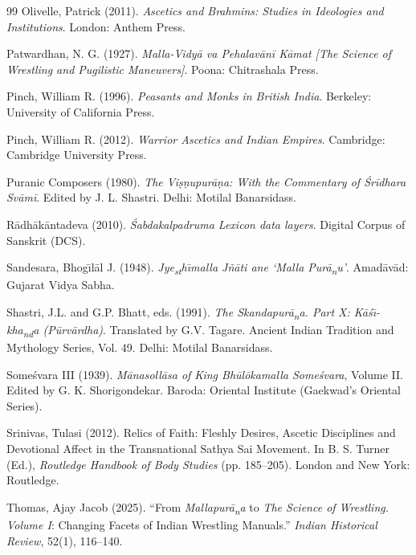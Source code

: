 \documentclass[11pt,twoside,letterpaper]{article}
\begin{document}
\begin{thebibliography}{99}
Olivelle, Patrick (2011). \textit{Ascetics and Brahmins: Studies in Ideologies and Institutions}. London: Anthem Press.

Patwardhan, N. G. (1927). \textit{Malla-Vidyā va Pehalavānī Kāmat [The Science of Wrestling and Pugilistic Maneuvers]}. Poona: Chitrashala Press.

Pinch, William R. (1996). \textit{Peasants and Monks in British India}. Berkeley: University of California Press.

Pinch, William R. (2012). \textit{Warrior Ascetics and Indian Empires}. Cambridge: Cambridge University Press.

Puranic Composers (1980). \textit{The Viṣṇupurāṇa: With the Commentary of Śrīdhara Svāmī}. Edited by J. L. Shastri. Delhi: Motilal Banarsidass.

Rādhākāntadeva (2010). \textit{Śabdakalpadruma Lexicon data layers}. Digital Corpus of Sanskrit (DCS).

Sandesara, Bhog\={\i}l\={a}l J. (1948). \textit{Jye\textsubscript{s}\textsubscript{t}h\={\i}malla J\~n\={a}ti ane `Malla Pur\={a}\textsubscript{n}u'}. Amad\={a}v\={a}d: Gujarat Vidya Sabha.

Shastri, J.L. and G.P. Bhatt, eds. (1991). \textit{The Skandapur\={a}\textsubscript{n}a. Part X: K\={a}\'{s}\={\i}-kha\textsubscript{n}\textsubscript{d}a (P\={u}rv\={a}rdha)}. Translated by G.V. Tagare. Ancient Indian Tradition and Mythology Series, Vol. 49. Delhi: Motilal Banarsidass.

Someśvara III (1939). \textit{Mānasollāsa of King Bhūlōkamalla Someśvara}, Volume II. Edited by G. K. Shorigondekar. Baroda: Oriental Institute (Gaekwad's Oriental Series).

Srinivas, Tulasi (2012). Relics of Faith: Fleshly Desires, Ascetic Disciplines and Devotional Affect in the Transnational Sathya Sai Movement. In B. S. Turner (Ed.), \textit{Routledge Handbook of Body Studies} (pp. 185--205). London and New York: Routledge.

Thomas, Ajay Jacob (2025). ``From \textit{Mallapur\={a}\textsubscript{n}a} to \textit{The Science of Wrestling. Volume I}: Changing Facets of Indian Wrestling Manuals.'' \textit{Indian Historical Review}, 52(1), 116--140.


\end{thebibliography}
\end{document}
